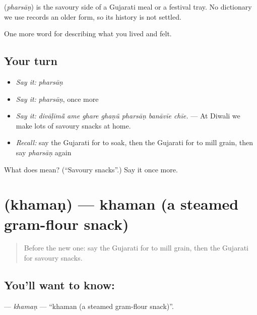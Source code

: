 \begin{cousinweb}
\textbf{} (\emph{pharsāṇ}) is the savoury side of a Gujarati meal or a festival tray. No dictionary we use records an older form, so its history is not settled.
\end{cousinweb}

\begin{grammarlens}[title={What you've built}]
One more word for describing what you lived and felt.
\end{grammarlens}

\subsection*{Your turn}
\begin{itemize}
\raggedright
  \item \emph{Say it:} \emph{pharsāṇ}
  \item \emph{Say it:} \emph{pharsāṇ}, once more
  \item \emph{Say it:} \emph{divāḷīmā̃ ame ghare ghaṇũ pharsāṇ banāvīe chīe.} — At Diwali we make lots of savoury snacks at home.
  \item \emph{Recall:} say the Gujarati for to soak, then the Gujarati for to mill grain, then say \emph{pharsāṇ} again
\end{itemize}

\begin{tcolorbox}[breakable,colback=teal!4,colframe=teal!35!black,title={Before you move on}]
What does  mean? (\textquotedblleft{}Savoury snacks\textquotedblright{}.) Say it once more.
\end{tcolorbox}
\section[\texorpdfstring{\gu{ખમણ} (khamaṇ)}{ખમણ (khamaṇ)}]{ (khamaṇ) — khaman (a steamed gram-flour snack)}

\label{lesson:GU-C523-khaman}



\begin{quote}
Before the new one: say the Gujarati for to mill grain, then the Gujarati for savoury snacks.
\end{quote}

\subsection*{You'll want to know: }
\textbf{} — \emph{khamaṇ} — \textquotedblleft{}khaman (a steamed gram-flour snack)\textquotedblright{}.

